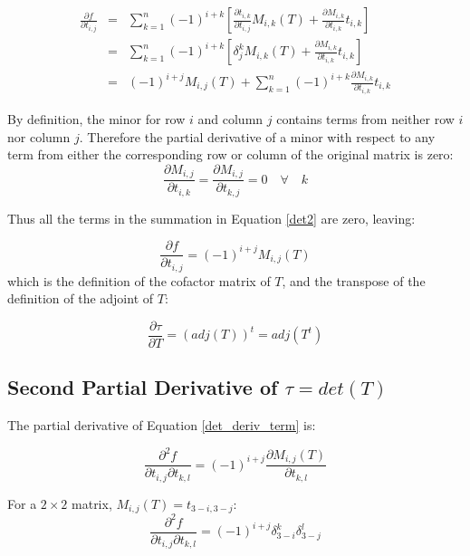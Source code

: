 \documentclass{report}
\begin{document}
\begin{eqnarray}
\frac{\partial f}{\partial t_{i,j}} &=& 
\sum_{k=1}^n (-1)^{i+k} \left[
 \frac{\partial t_{i,k}}{\partial t_{i,j}} M_{i,k}(T) + 
 \frac{\partial M_{i,k}}{\partial t_{i,k}} t_{i,k} \right] \\
 &=& \sum_{k=1}^n (-1)^{i+k} \left[
 \delta^k_j M_{i,k}(T) + 
 \frac{\partial M_{i,k}}{\partial t_{i,k}} t_{i,k} \right] \\
\label{det2}
 &=& (-1)^{i+j} M_{i,j}(T) + \sum_{k=1}^n (-1)^{i+k} \frac{\partial 
   M_{i,k}}{\partial t_{i,k}} t_{i,k}
\end{eqnarray}

\noindent By definition, the minor for row $i$ and column $j$ contains terms from neither row $i$ nor column $j$. Therefore the partial derivative of a minor with respect to any term from either the corresponding row or column of the original matrix is zero:
\begin{equation}\label{det3}
\frac{\partial M_{i,j}}{\partial t_{i,k}} = 
\frac{\partial M_{i,j}}{\partial t_{k,j}} = 0 \quad \forall \quad k
\end{equation}

\noindent Thus all the terms in the summation in Equation \ref{det2} are zero, leaving:

\begin{equation}\label{det_deriv_term}
\frac{\partial f}{\partial t_{i,j}} = (-1)^{i+j}M_{i,j}(T)
\end{equation}
which is the definition of the cofactor matrix of $T$, and the transpose of the definition of the adjoint of $T$:

\begin{equation}
\label{adjform}
\frac{\partial \tau}{\partial T} = (adj(T))^t = adj(T^t)
\end{equation}

\subsection{Second Partial Derivative of $\tau=det(T)$}

The partial derivative of Equation \ref{det_deriv_term} is:

\begin{equation}
\frac{\partial^2 f}{\partial t_{i,j} \partial t_{k,l}} = (-1)^{i+j}\frac{\partial M_{i,j}(T)}{\partial t_{k,l}}
\end{equation}

\noindent For a $2 \times 2$ matrix, $M_{i,j}(T) = t_{3-i,3-j}$:
\begin{equation}
\frac{\partial^2 f}{\partial t_{i,j} \partial t_{k,l}} = 
(-1)^{i+j} \delta_{3-i}^k \delta_{3-j}^l
\end{equation}
\end{document}
